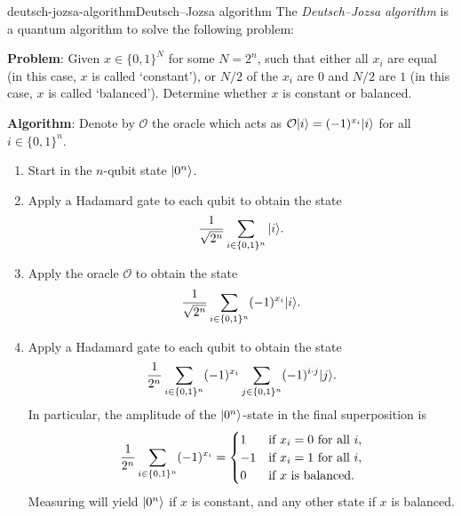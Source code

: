 \begin{topic}{deutsch-jozsa-algorithm}{Deutsch--Jozsa algorithm}
    The \emph{Deutsch--Jozsa algorithm} is a quantum algorithm to solve the following problem:
    
    \textbf{Problem}: Given $x \in \{ 0, 1 \}^N$ for some $N = 2^n$, such that either all $x_i$ are equal (in this case, $x$ is called `constant'), or $N / 2$ of the $x_i$ are $0$ and $N / 2$ are $1$ (in this case, $x$ is called `balanced'). Determine whether $x$ is constant or balanced.
    
    \textbf{Algorithm}: Denote by $\mathcal{O}$ the oracle which acts as $\mathcal{O} |i\rangle = (-1)^{x_i} |i\rangle$ for all $i \in \{ 0, 1 \}^n$.
    \begin{enumerate}[label=(\arabic*)]
        \item Start in the $n$-qubit state $|0^n\rangle$.
        \item Apply a Hadamard gate to each qubit to obtain the state
        \[ \frac{1}{\sqrt{2^n}} \sum_{i \in \{ 0, 1 \}^n } |i\rangle . \]
        \item Apply the oracle $\mathcal{O}$ to obtain the state
        \[ \frac{1}{\sqrt{2^n}} \sum_{i \in \{ 0, 1 \}^n} (-1)^{x_i} |i\rangle . \]
        \item Apply a Hadamard gate to each qubit to obtain the state
        \[ \frac{1}{2^n} \sum_{i \in \{ 0, 1 \}^n} (-1)^{x_i} \sum_{j \in \{ 0, 1 \}^n} (-1)^{i \cdot j} |j\rangle . \]
        In particular, the amplitude of the $|0^n\rangle$-state in the final superposition is
        \[ \frac{1}{2^n} \sum_{i \in \{ 0, 1 \}^n} (-1)^{x_i} = \begin{cases}
            1 & \textup{if } x_i = 0 \textup{ for all } i , \\
            -1 & \textup{if } x_i = 1 \textup{ for all } i , \\
            0 & \textup{if } x \textup{ is balanced} .
        \end{cases} \]
        Measuring will yield $|0^n\rangle$ if $x$ is constant, and any other state if $x$ is balanced.
    \end{enumerate}
\end{topic}

